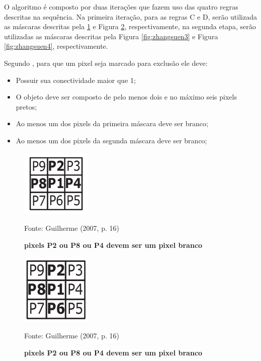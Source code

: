 \documentclass[
	12pt,				%
	oneside,			%
	a4paper,			%
	english,			%
	french,				%
	spanish,			%
	brazil,				%
	]{abntex2}
\begin{document}
O algoritmo é composto por duas iterações que fazem uso das quatro regras descritas na sequência. Na primeira iteração, para as regras C e D, serão utilizada as máscaras descritas pela \ref{fig:zhangsuen1} e Figura \ref{fig:zhangsuen2}, respectivamente, na segunda etapa, serão utilizadas as máscaras descritas pela Figura \ref{fig:zhangsuen3} e Figura \ref{fig:zhangsuen4}, respectivamente.

Segundo \citet{guilherme:2007}, para que um pixel seja marcado para exclusão ele deve:

\begin{itemize}
\item Possuir sua conectividade maior que 1;
\item O objeto deve ser composto de pelo menos dois e no máximo seis pixels pretos;
\item Ao menos um dos pixels da primeira máscara deve ser branco;
\item Ao menos um dos pixels da segunda máscara deve ser branco;
\end{itemize}


\begin{figure}[ht]
\centering
\caption{\textbf{pixels P2 ou P8 ou P4 devem ser um pixel branco}}
\includegraphics[width=0.3\textwidth]{imagens/zhangsuen1.png}

Fonte: Guilherme (2007, p. 16)
\label{fig:zhangsuen1}
\end{figure}


\begin{figure}[ht]
\centering
\caption{\textbf{pixels P2 ou P8 ou P4 devem ser um pixel branco}}
\includegraphics[width=0.3\textwidth]{imagens/zhangsuen2.png}

Fonte: Guilherme (2007, p. 16)
\label{fig:zhangsuen2}
\end{figure}
\end{document}
